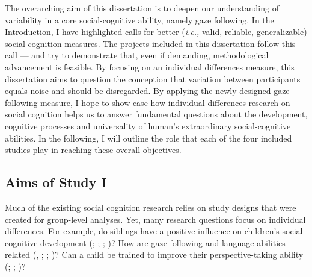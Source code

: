 \documentclass[
]{scrbook}
\begin{document}
The overarching aim of this dissertation is to deepen our understanding of variability in a core social-cognitive ability, namely gaze following. In the \hyperref[introduction]{Introduction}, I have highlighted calls for better (\emph{i.e.,} valid, reliable, generalizable) social cognition measures. The projects included in this dissertation follow this call --- and try to demonstrate that, even if demanding, methodological advancement is feasible. By focusing on an individual differences measure, this dissertation aims to question the conception that variation between participants equals noise and should be disregarded. By applying the newly designed gaze following measure, I hope to show-case how individual differences research on social cognition helps us to answer fundamental questions about the development, cognitive processes and universality of human's extraordinary social-cognitive abilities. In the following, I will outline the role that each of the four included studies play in reaching these overall objectives.

\subsection{Aims of Study I}\label{aimsI}

Much of the existing social cognition research relies on study designs that were created for group-level analyses. Yet, many research questions focus on individual differences. For example, do siblings have a positive influence on children's social-cognitive development (; ; ; )? How are gaze following and language abilities related (, ; ; )? Can a child be trained to improve their perspective-taking ability (; ; )?
\end{document}
